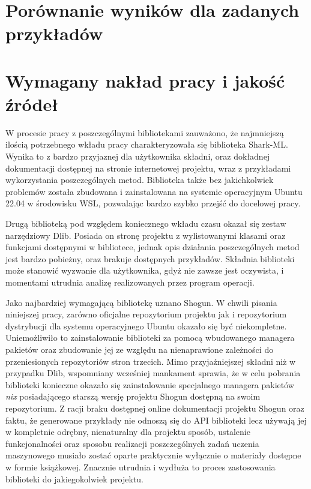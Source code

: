 \section{Porównanie wyników dla zadanych przykładów}
\section{Wymagany nakład pracy i jakość źródeł}

W procesie pracy z poszczególnymi bibliotekami zauważono, że najmniejszą ilością potrzebnego wkładu pracy charakteryzowała się biblioteka Shark-ML. Wynika to z bardzo przyjaznej dla użytkownika składni, oraz dokładnej dokumentacji dostępnej na stronie internetowej projektu, wraz z przykładami wykorzystania poszczególnych metod. Biblioteka także bez jakichkolwiek problemów została zbudowana i zainstalowana na systemie operacyjnym Ubuntu 22.04 w środowisku WSL, pozwalając bardzo szybko przejść do docelowej pracy.

Drugą biblioteką pod względem koniecznego wkładu czasu okazał się zestaw narzędziowy Dlib. Posiada on stronę projektu z wylistowanymi klasami oraz funkcjami dostępnymi w bibliotece, jednak opis działania poszczególnych metod jest bardzo pobieżny, oraz brakuje dostępnych przykładów. Składnia biblioteki może stanowić wyzwanie dla użytkownika, gdyż nie zawsze jest oczywista, i momentami utrudnia analizę realizowanych przez program operacji.

Jako najbardziej wymagającą bibliotekę uznano Shogun. W chwili pisania niniejszej pracy, zarówno oficjalne repozytorium projektu jak i repozytorium dystrybucji dla systemu operacyjnego Ubuntu okazało się być niekompletne. Uniemożliwiło to zainstalowanie biblioteki za pomocą wbudowanego managera pakietów oraz zbudowanie jej ze względu na nienaprawione zależności do przeniesionych repozytoriów stron trzecich. Mimo przyjaźniejszej składni niż w przypadku Dlib, wspomniany wcześniej mankament sprawia, że w celu pobrania biblioteki konieczne okazało się zainstalowanie specjalnego managera pakietów \textit{nix} posiadającego starszą wersję projektu Shogun dostępną na swoim repozytorium. Z racji braku dostępnej online dokumentacji projektu Shogun oraz faktu, że generowane przykłady nie odnoszą się do API biblioteki lecz używają jej w kompletnie odrębny, nienaturalny dla projektu sposób, ustalenie funkcjonalności oraz sposobu realizacji poszczególnych zadań uczenia maszynowego musiało zostać oparte praktycznie wyłącznie o materiały dostępne w formie książkowej. Znacznie utrudnia i wydłuża to proces zastosowania biblioteki do jakiegokolwiek projektu.